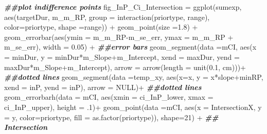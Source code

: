 \documentclass[
]{article}
\newenvironment{Shaded}{\begin{snugshade}}{\end{snugshade}}
\newcommand{\AttributeTok}[1]{\textcolor[rgb]{0.77,0.63,0.00}{#1}}
\newcommand{\ConstantTok}[1]{\textcolor[rgb]{0.00,0.00,0.00}{#1}}
\newcommand{\DecValTok}[1]{\textcolor[rgb]{0.00,0.00,0.81}{#1}}
\newcommand{\DocumentationTok}[1]{\textcolor[rgb]{0.56,0.35,0.01}{\textbf{\textit{#1}}}}
\newcommand{\FloatTok}[1]{\textcolor[rgb]{0.00,0.00,0.81}{#1}}
\newcommand{\FunctionTok}[1]{\textcolor[rgb]{0.00,0.00,0.00}{#1}}
\newcommand{\NormalTok}[1]{#1}
\newcommand{\OtherTok}[1]{\textcolor[rgb]{0.56,0.35,0.01}{#1}}
\newcommand{\SpecialCharTok}[1]{\textcolor[rgb]{0.00,0.00,0.00}{#1}}
\newcommand{\StringTok}[1]{\textcolor[rgb]{0.31,0.60,0.02}{#1}}
\begin{document}
\begin{Shaded}
\begin{Highlighting}[]
\DocumentationTok{\#\#plot indifference points}
\NormalTok{fig\_InP\_Ci\_Intersection }\OtherTok{=} \FunctionTok{ggplot}\NormalTok{(sumexp,}
                                 \FunctionTok{aes}\NormalTok{(targetDur, m\_m\_RP, }\AttributeTok{group =} \FunctionTok{interaction}\NormalTok{(priortype, range), }\AttributeTok{color=}\NormalTok{priortype, }\AttributeTok{shape =}\NormalTok{range))  }\SpecialCharTok{+}
  \FunctionTok{geom\_point}\NormalTok{(}\AttributeTok{size =}\FloatTok{1.8}\NormalTok{) }\SpecialCharTok{+} 
  \FunctionTok{geom\_errorbar}\NormalTok{(}\FunctionTok{aes}\NormalTok{(}\AttributeTok{ymin =}\NormalTok{ m\_m\_RP}\SpecialCharTok{{-}}\NormalTok{m\_se\_err, }\AttributeTok{ymax =}\NormalTok{ m\_m\_RP }\SpecialCharTok{+}\NormalTok{ m\_se\_err), }\AttributeTok{width =} \FloatTok{0.05}\NormalTok{) }\SpecialCharTok{+}  \DocumentationTok{\#\#error bars}
  \FunctionTok{geom\_segment}\NormalTok{(}\AttributeTok{data =}\NormalTok{mCI, }\FunctionTok{aes}\NormalTok{(}\AttributeTok{x =}\NormalTok{ minDur, }\AttributeTok{y =}\NormalTok{ minDur}\SpecialCharTok{*}\NormalTok{m\_Slope}\SpecialCharTok{+}\NormalTok{m\_Intercept, }\AttributeTok{xend =}\NormalTok{ maxDur, }\AttributeTok{yend =}\NormalTok{ maxDur}\SpecialCharTok{*}\NormalTok{m\_Slope}\SpecialCharTok{+}\NormalTok{m\_Intercept), }\AttributeTok{arrow =} \FunctionTok{arrow}\NormalTok{(}\AttributeTok{length =} \FunctionTok{unit}\NormalTok{(}\FloatTok{0.1}\NormalTok{, }\StringTok{\textquotesingle{}cm\textquotesingle{}}\NormalTok{)))}\SpecialCharTok{+}  \DocumentationTok{\#\#dotted lines}
  \FunctionTok{geom\_segment}\NormalTok{(}\AttributeTok{data =}\NormalTok{temp\_xy, }\FunctionTok{aes}\NormalTok{(}\AttributeTok{x=}\NormalTok{x, }\AttributeTok{y =}\NormalTok{ x}\SpecialCharTok{*}\NormalTok{slope}\SpecialCharTok{+}\NormalTok{minRP, }\AttributeTok{xend =}\NormalTok{ inP, }\AttributeTok{yend =}\NormalTok{ inP), }\AttributeTok{arrow =} \ConstantTok{NULL}\NormalTok{)}\SpecialCharTok{+}  \DocumentationTok{\#\#dotted lines}
  \FunctionTok{geom\_errorbarh}\NormalTok{(}\AttributeTok{data =}\NormalTok{ mCI, }\FunctionTok{aes}\NormalTok{(}\AttributeTok{xmin =}\NormalTok{ ci\_InP\_lower, }\AttributeTok{xmax =}\NormalTok{ ci\_InP\_upper), }\AttributeTok{height =}\NormalTok{ .}\DecValTok{1}\NormalTok{)}\SpecialCharTok{+} 
  \FunctionTok{geom\_point}\NormalTok{(}\AttributeTok{data =}\NormalTok{mCI, }\FunctionTok{aes}\NormalTok{(}\AttributeTok{x =}\NormalTok{ IntersectionX, }\AttributeTok{y =}\NormalTok{ y, }\AttributeTok{color=}\NormalTok{priortype, }\AttributeTok{fill =} \FunctionTok{as.factor}\NormalTok{(priortype)), }\AttributeTok{shape=}\DecValTok{21}\NormalTok{) }\SpecialCharTok{+} \DocumentationTok{\#\# Intersection }

\end{Highlighting}
\end{Shaded}
\end{document}
